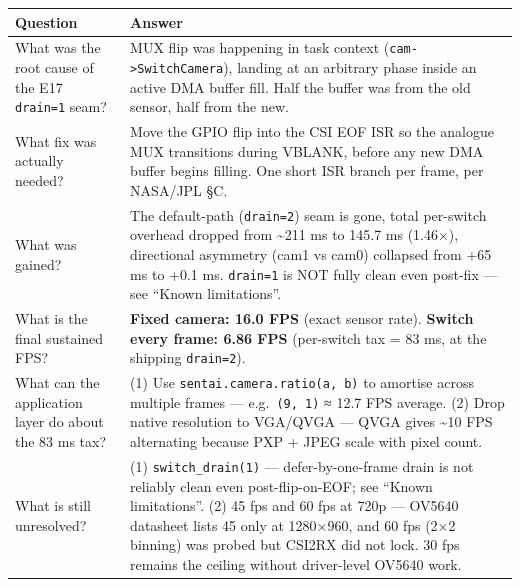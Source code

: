 {\def\LTcaptype{none} %
\begin{longtable}[]{@{}
  >{\raggedright\arraybackslash}p{}
  >{\raggedright\arraybackslash}p{}@{}}
\toprule\noalign{}
\begin{minipage}[b]{\linewidth}\raggedright
Question
\end{minipage} & \begin{minipage}[b]{\linewidth}\raggedright
Answer
\end{minipage} \\
\midrule\noalign{}
\endhead
\bottomrule\noalign{}
\endlastfoot
What was the root cause of the E17 \texttt{drain=1} seam? & MUX flip was
happening in task context (\texttt{cam-\textgreater{}SwitchCamera}),
landing at an arbitrary phase inside an active DMA buffer fill. Half the
buffer was from the old sensor, half from the new. \\
What fix was actually needed? & Move the GPIO flip into the CSI EOF ISR
so the analogue MUX transitions during VBLANK, before any new DMA buffer
begins filling. One short ISR branch per frame, per NASA/JPL §C. \\
What was gained? & The default-path (\texttt{drain=2}) seam is gone,
total per-switch overhead dropped from \textasciitilde211 ms to 145.7 ms
(1.46×), directional asymmetry (cam1 vs cam0) collapsed from +65 ms to
+0.1 ms. \texttt{drain=1} is NOT fully clean even post-fix --- see
``Known limitations''. \\
What is the final sustained FPS? & \textbf{Fixed camera: 16.0 FPS}
(exact sensor rate). \textbf{Switch every frame: 6.86 FPS} (per-switch
tax = 83 ms, at the shipping \texttt{drain=2}). \\
What can the application layer do about the 83 ms tax? & (1) Use
\texttt{sentai.camera.ratio(a,\ b)} to amortise across multiple frames
--- e.g.~\texttt{(9,\ 1)} ≈ 12.7 FPS average. (2) Drop native resolution
to VGA/QVGA --- QVGA gives \textasciitilde10 FPS alternating because PXP
+ JPEG scale with pixel count. \\
What is still unresolved? & (1) \texttt{switch\_drain(1)} ---
defer-by-one-frame drain is not reliably clean even post-flip-on-EOF;
see ``Known limitations''. (2) 45 fps and 60 fps at 720p --- OV5640
datasheet lists 45 only at 1280×960, and 60 fps (2×2 binning) was probed
but CSI2RX did not lock. 30 fps remains the ceiling without driver-level
OV5640 work. \\
\end{longtable}
}

